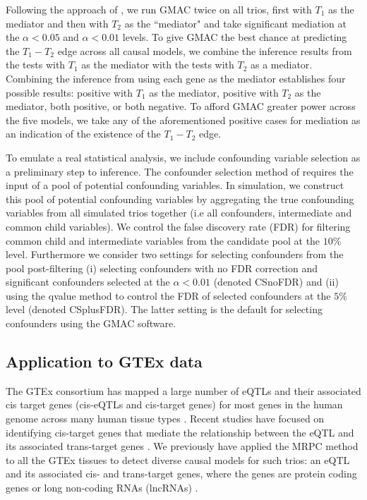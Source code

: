 \documentclass[12pt,letterpaper]{report}
\begin{document}
\begin{doublespace}
Following the approach of \cite{kvamme2022types}, we run GMAC twice on all trios, first with $T_1$ as the mediator and then with $T_2$ as the ``mediator" and take significant mediation at the $\alpha < 0.05$ and $\alpha < 0.01$ levels. To give GMAC the best chance at predicting the $T_1 - T_2$ edge across all causal models, we combine the inference results from the tests with $T_1$ as the mediator with the tests with $T_2$ as a mediator. Combining the inference from using each gene as the mediator establishes four possible results: positive with $T_1$ as the mediator, positive with $T_2$ as the mediator, both positive, or both negative. To afford GMAC greater power across the five models, we take any of the aforementioned positive cases for mediation as an indication of the existence of the $T_1 - T_2$ edge. 

To emulate a real statistical analysis, we include confounding variable selection as a preliminary step to inference. The confounder selection method of \cite{yang2017identifying} requires the input of a pool of potential confounding variables. In simulation, we construct this pool of potential confounding variables by aggregating the true confounding variables from all simulated trios together (i.e all confounders, intermediate and common child variables). We control the false discovery rate (FDR) for filtering common child and intermediate variables from the candidate pool at the $10\%$ level. Furthermore we consider two settings for selecting confounders from the pool post-filtering (i) selecting confounders with no FDR correction and significant confounders selected at the $\alpha < 0.01$ (denoted CSnoFDR) and (ii) using the qvalue method to control the FDR of selected confounders at the $5\%$ level (denoted CSplusFDR). The latter setting is the default for selecting confounders using the GMAC software. 


\subsection{Application to GTEx data}

The GTEx consortium has mapped a large number of eQTLs and their associated cis target genes (cis-eQTLs and cis-target genes) for most genes in the human genome across many human tissue types \cite{gtex2020}. Recent  studies have focused on identifying cis-target genes that mediate the relationship between the eQTL and its associated trans-target genes \cite{yang2017identifying}.  We previously have applied the MRPC method to all the GTEx tissues to detect diverse causal models for such trios: an eQTL and its associated cis- and trans-target genes, where the genes are protein coding genes or long non-coding RNAs (lncRNAs) \cite{kvamme2022types}.  


\end{doublespace}
\end{document}
